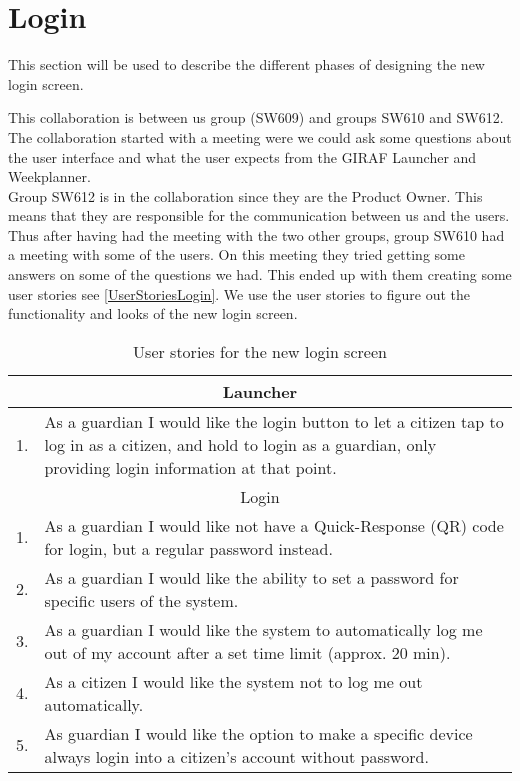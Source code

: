 \section{Login}
This section will be used to describe the different phases of designing the new
login screen.

This collaboration is between us group (SW609) and groups SW610 and SW612. The
collaboration started with a meeting were we could ask some questions about the
user interface and what the user expects from the GIRAF Launcher and
Weekplanner. \\
Group SW612 is in the collaboration since they are the Product Owner. This means
that they are responsible for the communication between us and the users. Thus
after having had the meeting with the two other groups, group SW610 had a
meeting with some of the users. On this meeting they tried getting some answers
on some of the questions we had. This ended up with them creating some user
stories see \autoref{UserStoriesLogin}. We use the user stories to figure out
the functionality and looks of the new login screen. 

\begin{table}[H]
\begin{tabular}{|c|p{12.5cm}|}
\hline 
\multicolumn{2}{|c|}{Launcher}\\
\hline
1. & As a guardian I would like the login button to let a citizen tap to log in
as a citizen, and hold to login as a guardian, only providing login information
at that point. \\ \hline
\multicolumn{2}{|c|}{Login}\\ \hline
1. & As a guardian I would like not have a Quick-Response (QR) code for login,
but a regular password instead.\\ \hline
2. & As a guardian I would like the ability to set a password for specific users
of the system.\\ \hline
3. & As a guardian I would like the system to automatically log me out of my
account after a set time limit (approx. 20 min).\\ \hline
4. & As a citizen I would like the system not to log me out automatically.\\ \hline
5. & As guardian I would like the option to make a specific device always login
into a citizen's account without password.\\ \hline
\end{tabular}
\caption{User stories for the new login screen}
\label{UserStoriesLogin}
\end{table}

